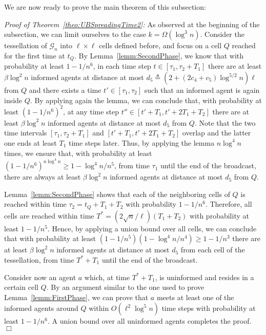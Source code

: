 \documentclass[11pt]{article}
\newcommand{\bigO}[1]{O\left(#1\right)}
\newcommand{\bigOm}[1]{\Omega\left(#1\right)}
\newcommand{\grid}{\mathcal{G}_n}
\newenvironment{proofof}[1]{\begin{trivlist} 
                         \item[] {\it Proof of #1:}}{\hfill $\Box$
                       \end{trivlist}}
\begin{document}
We are now ready to prove the main theorem of this subsection:
\begin{proofof}{Theorem~\ref{theo:UBSpreadingTime2}}
As observed at the beginning of the subsection, we can limit ourselves
to the case $k=\bigOm{\log^3 n}$.  Consider the tessellation of
$\grid$ into $\ell \times \ell$ cells defined before, and
focus on a cell $Q$ reached for the first time at $t_Q$.
By Lemma~\ref{lemm:SecondPhase}, we know that with probability at
least $1-1/n^6$, in each time step $t \in [\tau_1, \tau_2 + T_1]$
there are at least $\beta \log^2 n$ informed agents at distance at
most $d_5 \triangleq (2 + (2c_4 + c_5) \log^{5/2} n) \ell$ from $Q$
and there exists a time $t' \in [\tau_1, \tau_2]$ such that an informed agent
is again inside $Q$.
By applying again the lemma, we can conclude that, with probability at
least $(1-1/n^6)^2$, at any time step $t'' \in [t'+T_1, t'+ 2 T_1 +
  T_2]$ there are at least $\beta \log^2 n$ informed agents at
distance at most $d_5$ from $Q$.  Note that the
two time intervals $[\tau_1, \tau_2 + T_1]$ and $[t'+T_1, t'+ 2 T_1 +
  T_2]$ overlap and the latter one ends at least
$T_1$ time steps later.  Thus, by applying the lemma $n \log^4 n$
times, we ensure that, with probability at least 
$(1-1/n^6)^{n \log^4 n} \geq 1-\log^4 n/n^5$, 
from time $\tau_1$ until the end of the broadcast, there
are always at least $\beta \log^2 n$ informed agents at distance at
most $d_5$ from $Q$.

Lemma~\ref{lemm:SecondPhase} shows that each of the neighboring cells
of $Q$ is reached within time $\tau_2 = t_Q + T_1 + T_2$ with
probability $1 - 1/n^6$. Therefore, all cells are reached within time
$T^* = ({2\sqrt{n}}/{\ell})(T_1 + T_2)$ with probability at least $1 - 1/n^5$.
Hence, by applying a union bound over all cells,
we can conclude that with probability at least 
$(1 - 1/n^5)(1-\log^4 n/n^4) \geq 1-1/n^3$
there are at least $\beta \log^2 n$ informed agents at
distance at most $d_5$ from each cell of the tessellation,
from time $T^*+T_1$ until the end of the broadcast.

Consider now an agent $a$ which, at time $T^*+T_1$, is uninformed and resides in
a certain cell $Q$.  By an argument similar to the one used to prove
Lemma~\ref{lemm:FirstPhase}, we can prove that $a$ meets at least one
of the informed agents around $Q$ within $\bigO{\ell^2 \log^5 n}$ time
steps with probability at least $1-1/n^6$. A union bound over all
uninformed agents completes the proof.
\end{proofof}
\end{document}
